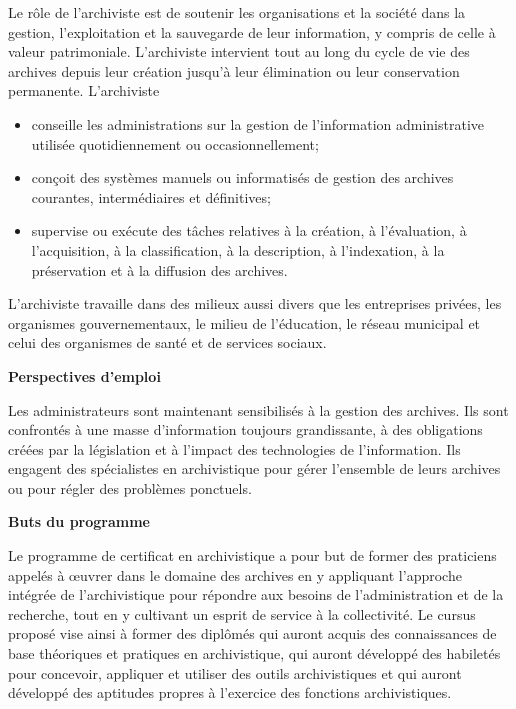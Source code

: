 \documentclass [12 pt]{article}
\begin{document}
            Le rôle de l'archiviste est de soutenir les organisations et la société dans la
                gestion, l'exploitation et la sauvegarde de leur information, y compris de celle à
                valeur patrimoniale. L'archiviste intervient tout au long du cycle de vie des
                archives depuis leur création jusqu'à leur élimination ou leur conservation
                permanente.
            L'archiviste
            
        \begin{itemize}
        
                
        \item conseille les administrations sur la gestion de l'information administrative
                    utilisée quotidiennement ou occasionnellement;
                
        \item conçoit des systèmes manuels ou informatisés de gestion des archives courantes,
                    intermédiaires et définitives;
                
        \item supervise ou exécute des tâches relatives à la création, à l'évaluation, à
                    l'acquisition, à la classification, à la description, à l'indexation, à la
                    préservation et à la diffusion des archives.
            
        \end{itemize}
    
            L'archiviste travaille dans des milieux aussi divers que les entreprises privées, les
                organismes gouvernementaux, le milieu de l'éducation, le réseau municipal et celui
                des organismes de santé et de services sociaux.
            
        \textbf{
        Perspectives d'emploi
        }
    
            Les administrateurs sont maintenant sensibilisés à la gestion des archives. Ils sont
                confrontés à une masse d'information toujours grandissante, à des obligations créées
                par la législation et à l'impact des technologies de l'information. Ils engagent des
                spécialistes en archivistique pour gérer l'ensemble de leurs archives ou pour régler
                des problèmes ponctuels.
            
        \textbf{
        Buts du programme
        }
    
            Le programme de certificat en archivistique a pour but de former des praticiens
                appelés à œuvrer dans le domaine des archives en y appliquant l'approche intégrée de
                l'archivistique pour répondre aux besoins de l'administration et de la recherche,
                tout en y cultivant un esprit de service à la collectivité.
            Le cursus proposé vise ainsi à former des diplômés qui auront acquis des
                connaissances de base théoriques et pratiques en archivistique, qui auront développé
                des habiletés pour concevoir, appliquer et utiliser des outils archivistiques et qui
                auront développé des aptitudes propres à l'exercice des fonctions
                archivistiques.
            
\end{document}
